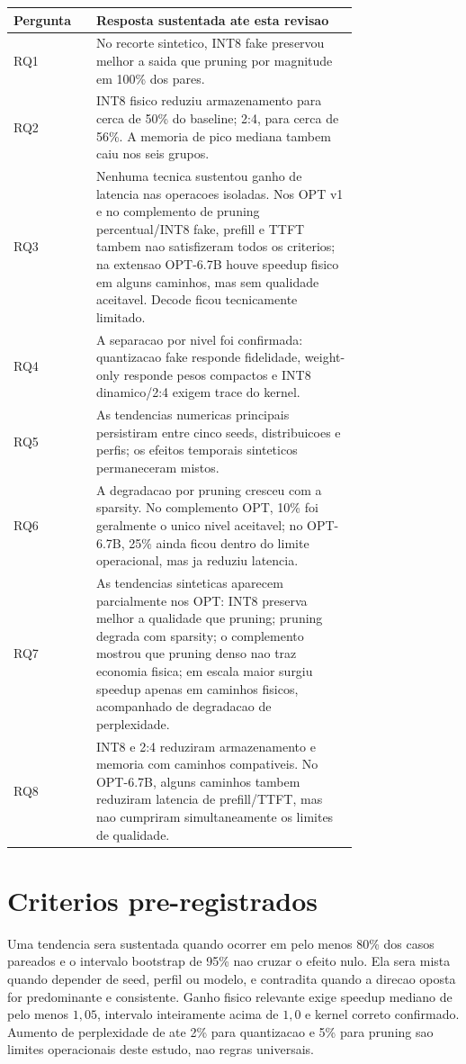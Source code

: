 \begin{longtable}{@{}lp{0.76\linewidth}@{}}
\toprule
\textbf{Pergunta} & \textbf{Resposta sustentada ate esta revisao} \\
\midrule
RQ1 & No recorte sintetico, INT8 fake preservou melhor a saida que pruning por magnitude em 100\% dos pares. \\
RQ2 & INT8 fisico reduziu armazenamento para cerca de 50\% do baseline; 2:4, para cerca de 56\%. A memoria de pico mediana tambem caiu nos seis grupos. \\
RQ3 & Nenhuma tecnica sustentou ganho de latencia nas operacoes isoladas. Nos OPT v1 e no complemento de pruning percentual/INT8 fake, prefill e TTFT tambem nao satisfizeram todos os criterios; na extensao OPT-6.7B houve speedup fisico em alguns caminhos, mas sem qualidade aceitavel. Decode ficou tecnicamente limitado. \\
RQ4 & A separacao por nivel foi confirmada: quantizacao fake responde fidelidade, weight-only responde pesos compactos e INT8 dinamico/2:4 exigem trace do kernel. \\
RQ5 & As tendencias numericas principais persistiram entre cinco seeds, distribuicoes e perfis; os efeitos temporais sinteticos permaneceram mistos. \\
RQ6 & A degradacao por pruning cresceu com a sparsity. No complemento OPT, 10\% foi geralmente o unico nivel aceitavel; no OPT-6.7B, 25\% ainda ficou dentro do limite operacional, mas ja reduziu latencia. \\
RQ7 & As tendencias sinteticas aparecem parcialmente nos OPT: INT8 preserva melhor a qualidade que pruning; pruning degrada com sparsity; o complemento mostrou que pruning denso nao traz economia fisica; em escala maior surgiu speedup apenas em caminhos fisicos, acompanhado de degradacao de perplexidade. \\
RQ8 & INT8 e 2:4 reduziram armazenamento e memoria com caminhos compativeis. No OPT-6.7B, alguns caminhos tambem reduziram latencia de prefill/TTFT, mas nao cumpriram simultaneamente os limites de qualidade. \\
\bottomrule
\end{longtable}

\section{Criterios pre-registrados}

Uma tendencia sera sustentada quando ocorrer em pelo menos 80\% dos casos
pareados e o intervalo bootstrap de 95\% nao cruzar o efeito nulo. Ela sera
mista quando depender de seed, perfil ou modelo, e contradita quando a direcao
oposta for predominante e consistente. Ganho fisico relevante exige speedup
mediano de pelo menos $1{,}05$, intervalo inteiramente acima de $1{,}0$ e kernel
correto confirmado. Aumento de perplexidade de ate 2\% para quantizacao e 5\%
para pruning sao limites operacionais deste estudo, nao regras universais.

